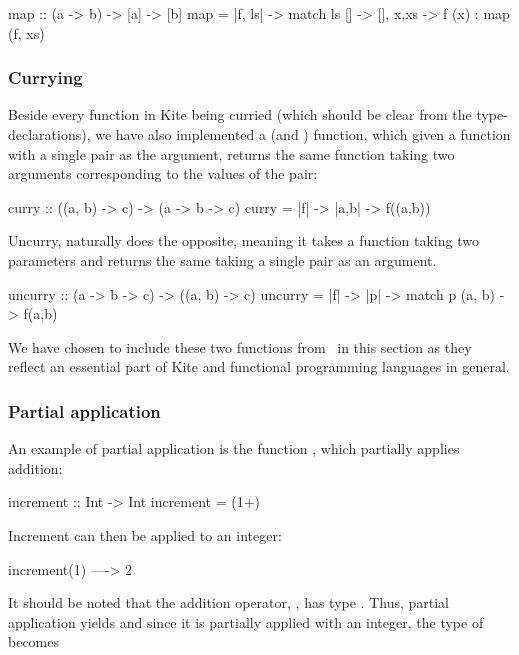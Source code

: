 \begin{kite}
map :: (a -> b) -> [a] -> [b]
map = |f, ls| -> {
  match ls {
    [] -> [],
    x,xs -> f (x) : map (f, xs)
  }
}
\end{kite}

\subsubsection{Currying}
\label{subsubsec:currying}
Beside every function in Kite being curried (which should be clear from the type-declarations), we have also implemented a  (and ) function, which given a function with a single pair as the argument, returns the same function taking two arguments corresponding to the values of the pair:

\begin{kite}
curry :: ((a, b) -> c) -> (a -> b -> c)
curry = |f| -> {
  |a,b| -> {
    f((a,b))
  }
}
\end{kite}

Uncurry, naturally does the opposite, meaning it takes a function taking two parameters and returns the same taking a single pair as an argument.

\begin{kite}
uncurry :: (a -> b -> c) -> ((a, b) -> c)
uncurry = |f| -> {
  |p| -> {
    match p {
      (a, b) -> f(a,b)
    }
  }
}
\end{kite}

We have chosen to include these two functions from~ in this section as they reflect an essential part of Kite and functional programming languages in general.

\subsubsection{Partial application}
An example of partial application is the function , which partially applies addition:

\begin{kite}
increment :: Int -> Int
increment = (1+)
\end{kite}

Increment can then be applied to an integer:

\begin{kite}
increment(1) ----> 2
\end{kite}

It should be noted that the addition operator, \code{+}, has type . Thus, partial application yields  and since
it is partially applied with an integer, the type of 
becomes 

